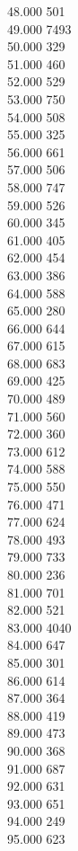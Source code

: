 { 48.000	501 \\
 49.000	7493 \\
 50.000	329 \\
 51.000	460 \\
 52.000	529 \\
 53.000	750 \\
 54.000	508 \\
 55.000	325 \\
 56.000	661 \\
 57.000	506 \\
 58.000	747 \\
 59.000	526 \\
 60.000	345 \\
 61.000	405 \\
 62.000	454 \\
 63.000	386 \\
 64.000	588 \\
 65.000	280 \\
 66.000	644 \\
 67.000	615 \\
 68.000	683 \\
 69.000	425 \\
 70.000	489 \\
 71.000	560 \\
 72.000	360 \\
 73.000	612 \\
 74.000	588 \\
 75.000	550 \\
 76.000	471 \\
 77.000	624 \\
 78.000	493 \\
 79.000	733 \\
 80.000	236 \\
 81.000	701 \\
 82.000	521 \\
 83.000	4040 \\
 84.000	647 \\
 85.000	301 \\
 86.000	614 \\
 87.000	364 \\
 88.000	419 \\
 89.000	473 \\
 90.000	368 \\
 91.000	687 \\
 92.000	631 \\
 93.000	651 \\
 94.000	249 \\
 95.000	623 \\
}
